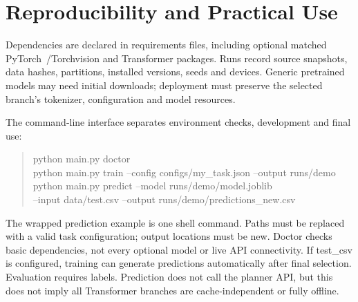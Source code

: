 \documentclass[11pt,a4paper]{article}
\begin{document}
\section{Reproducibility and Practical Use}
Dependencies are declared in requirements files, including optional matched PyTorch~\cite{pytorch}/Torchvision and Transformer packages. Runs record source snapshots, data hashes, partitions, installed versions, seeds and devices. Generic pretrained models may need initial downloads; deployment must preserve the selected branch's tokenizer, configuration and model resources.

The command-line interface separates environment checks, development and final use:
\begin{quote}\small\ttfamily
python main.py doctor\\
python main.py train --config configs/my\_task.json --output runs/demo\\
python main.py predict --model runs/demo/model.joblib\\
\hspace*{1em}--input data/test.csv --output runs/demo/predictions\_new.csv
\end{quote}
The wrapped prediction example is one shell command. Paths must be replaced with a valid task configuration; output locations must be new. Doctor checks basic dependencies, not every optional model or live API connectivity. If test\_csv is configured, training can generate predictions automatically after final selection. Evaluation requires labels. Prediction does not call the planner API, but this does not imply all Transformer branches are cache-independent or fully offline.
\end{document}
